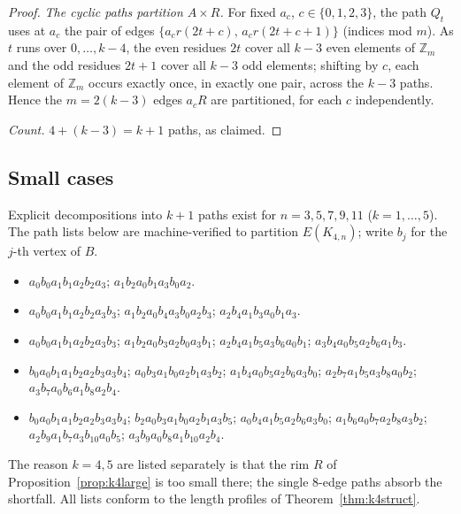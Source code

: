 \begin{proof}
\emph{The cyclic paths partition $A\times R$.}
For fixed $a_c$, $c\in\{0,1,2,3\}$, the path $Q_t$ uses at $a_c$ the pair of edges
$\{a_cr(2t+c),\,a_cr(2t+c+1)\}$ (indices mod $m$). As $t$ runs over $0,\dots,k-4$, the even
residues $2t$ cover all $k-3$ even elements of $\mathbb{Z}_m$ and the odd residues $2t+1$ cover
all $k-3$ odd elements; shifting by $c$, each element of $\mathbb{Z}_m$ occurs exactly once,
in exactly one pair, across the $k-3$ paths. Hence the $m=2(k-3)$ edges $a_cR$ are partitioned,
for each $c$ independently.

\emph{Count.} $4+(k-3)=k+1$ paths, as claimed.
\end{proof}

\subsection{Small cases}

\begin{proposition}\label{prop:k4small}
Explicit decompositions into $k+1$ paths exist for $n=3,5,7,9,11$ ($k=1,\dots,5$). The path
lists below are machine-verified to partition $E(K_{4,n})$; write $b_j$ for the $j$-th vertex
of $B$.
\begingroup\sloppy
\begin{itemize}[leftmargin=1.5em]
\item[{$k=1$ ($n=3$; lengths $[6,6]$):}]
$a_0b_0a_1b_1a_2b_2a_3$;\quad
$a_1b_2a_0b_1a_3b_0a_2$.
\item[{$k=2$ ($n=5$; $[6,7,7]$):}]
$a_0b_0a_1b_1a_2b_2a_3b_3$;\quad
$a_1b_2a_0b_4a_3b_0a_2b_3$;\quad
$a_2b_4a_1b_3a_0b_1a_3$.
\item[{$k=3$ ($n=7$; $[7,7,7,7]$):}]
$a_0b_0a_1b_1a_2b_2a_3b_3$;\quad
$a_1b_2a_0b_3a_2b_0a_3b_1$;\quad
$a_2b_4a_1b_5a_3b_6a_0b_1$;\quad
$a_3b_4a_0b_5a_2b_6a_1b_3$.
\item[{$k=4$ ($n=9$; $[7,7,7,7,8]$):}]
$b_0a_0b_1a_1b_2a_2b_3a_3b_4$;\quad
$a_0b_3a_1b_0a_2b_1a_3b_2$;\quad
$a_1b_4a_0b_5a_2b_6a_3b_0$;\quad
$a_2b_7a_1b_5a_3b_8a_0b_2$;\quad
$a_3b_7a_0b_6a_1b_8a_2b_4$.
\item[{$k=5$ ($n=11$; $[7,7,7,7,8,8]$):}]
$b_0a_0b_1a_1b_2a_2b_3a_3b_4$;\quad
$b_2a_0b_3a_1b_0a_2b_1a_3b_5$;\quad
$a_0b_4a_1b_5a_2b_6a_3b_0$;\quad
$a_1b_6a_0b_7a_2b_8a_3b_2$;\quad
$a_2b_9a_1b_7a_3b_{10}a_0b_5$;\quad
$a_3b_9a_0b_8a_1b_{10}a_2b_4$.
\end{itemize}
\endgroup
The reason $k=4,5$ are listed separately is that the rim $R$ of
Proposition~\ref{prop:k4large} is too small there; the single $8$-edge paths absorb the
shortfall. All lists conform to the length profiles of Theorem~\ref{thm:k4struct}.
\end{proposition}

